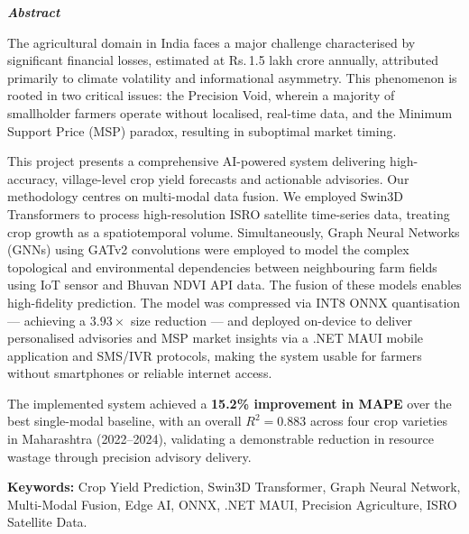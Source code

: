 \newpage
{}
\begin{center}
\emph{\Large \textbf{Abstract}}
\end{center}

The agricultural domain in India faces a major challenge characterised by significant financial losses, estimated at Rs.\,1.5 lakh crore annually, attributed primarily to climate volatility and informational asymmetry. This phenomenon is rooted in two critical issues: the Precision Void, wherein a majority of smallholder farmers operate without localised, real-time data, and the Minimum Support Price (MSP) paradox, resulting in suboptimal market timing.

This project presents a comprehensive AI-powered system delivering high-accuracy, village-level crop yield forecasts and actionable advisories. Our methodology centres on multi-modal data fusion. We employed Swin3D Transformers \cite{liu2022swin3d} to process high-resolution ISRO satellite time-series data, treating crop growth as a spatiotemporal volume. Simultaneously, Graph Neural Networks (GNNs) using GATv2 convolutions \cite{brody2022gatv2} were employed to model the complex topological and environmental dependencies between neighbouring farm fields using IoT sensor \cite{jain2022iot} and Bhuvan NDVI API data. The fusion of these models enables high-fidelity prediction. The model was compressed via INT8 ONNX quantisation --- achieving a $3.93\times$ size reduction --- and deployed on-device to deliver personalised advisories and MSP market insights via a .NET MAUI mobile application and SMS/IVR protocols, making the system usable for farmers without smartphones or reliable internet access.

The implemented system achieved a \textbf{15.2\% improvement in MAPE} over the best single-modal baseline, with an overall $R^2 = 0.883$ across four crop varieties in Maharashtra (2022--2024), validating a demonstrable reduction in resource wastage through precision advisory delivery.

\textbf{Keywords:} Crop Yield Prediction, Swin3D Transformer, Graph Neural Network, Multi-Modal Fusion, Edge AI, ONNX, .NET MAUI, Precision Agriculture, ISRO Satellite Data.
